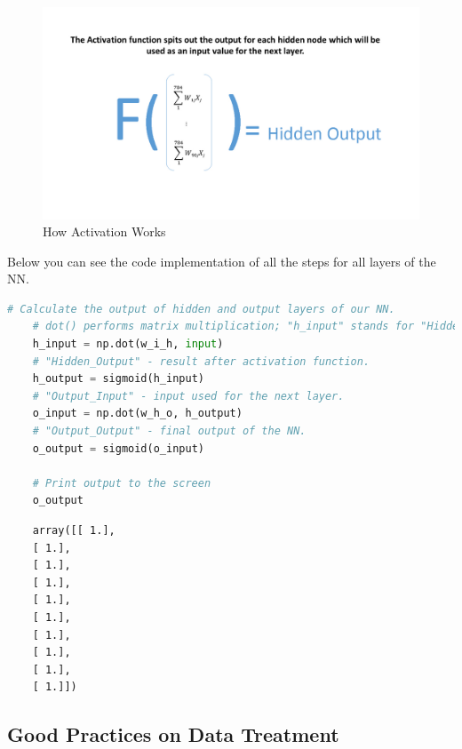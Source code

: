 \begin{figure}[H]
    \includegraphics[width=\linewidth]{pics/activation.jpg}
    \caption{\label{fig:activation} How Activation Works}
\end{figure}

Below you can see the code implementation of all the steps for all layers of the NN.

\begin{lstlisting}[language=Python]
    # Calculate the output of hidden and output layers of our NN.
    # dot() performs matrix multiplication; "h_input" stands for "Hidden_Input".
    h_input = np.dot(w_i_h, input) 
    # "Hidden_Output" - result after activation function.
    h_output = sigmoid(h_input) 
    # "Output_Input" - input used for the next layer.
    o_input = np.dot(w_h_o, h_output)
    # "Output_Output" - final output of the NN.
    o_output = sigmoid(o_input)

    # Print output to the screen
    o_output 
\end{lstlisting}

\begin{lstlisting}
    array([[ 1.],
    [ 1.],
    [ 1.],
    [ 1.],
    [ 1.],
    [ 1.],
    [ 1.],
    [ 1.],
    [ 1.],
    [ 1.]])
\end{lstlisting}

\subsection{Good Practices on Data Treatment}

